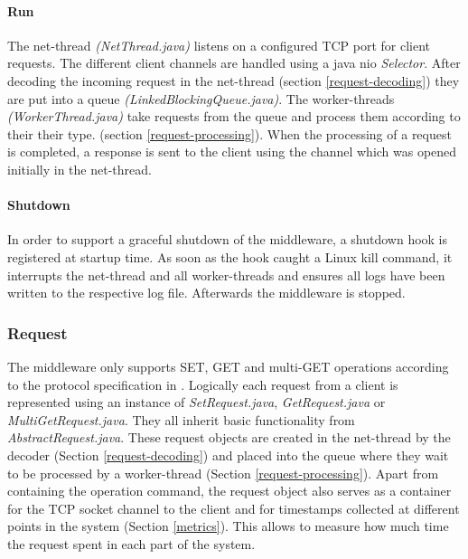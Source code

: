 \documentclass[report.tex]{subfiles}
\begin{document}
\paragraph{Run}
The net-thread \emph{(NetThread.java)} listens on a configured TCP port for client requests. The different client channels are handled using a java nio \emph{Selector}.
After decoding the incoming request in the net-thread (section \ref{request-decoding}) they are put into a queue \emph{(LinkedBlockingQueue.java)}.
The worker-threads \emph{(WorkerThread.java)} take requests from the queue and process them according to their their type. (section  \ref{request-processing}). When the processing of a request is completed, a response is sent to the client using the channel which was opened initially in the net-thread.


\paragraph{Shutdown}
In order to support a graceful shutdown of the middleware, a shutdown hook is registered at startup time. As soon as the hook caught a Linux kill command, it interrupts the net-thread and all worker-threads and ensures all logs have been written to the respective log file. Afterwards the middleware is stopped.

\subsubsection{Request}
The middleware only supports SET, GET and multi-GET operations according to the protocol specification in \cite{memcached:protocol}.
Logically each request from a client is represented using an instance of \emph{SetRequest.java}, \emph{GetRequest.java} or \emph{MultiGetRequest.java}. They all inherit basic functionality from \emph{AbstractRequest.java}.
These request objects are created in the net-thread by the decoder (Section \ref{request-decoding}) and placed into the queue where they wait to be processed by a worker-thread (Section \ref{request-processing}).
Apart from containing the operation command, the request object also serves as a container for the TCP socket channel to the client and for timestamps collected at different points in the system (Section \ref{metrics}). This allows to measure how much time the request spent in each part of the system.
\end{document}
